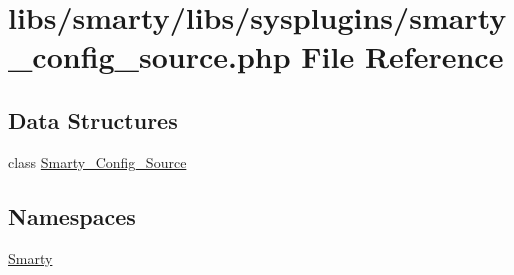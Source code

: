 \hypertarget{smarty__config__source_8php}{}\section{libs/smarty/libs/sysplugins/smarty\+\_\+config\+\_\+source.php File Reference}
\label{smarty__config__source_8php}
\subsection*{Data Structures}
\begin{DoxyCompactItemize}
\item 
class \hyperlink{class_smarty___config___source}{Smarty\+\_\+\+Config\+\_\+\+Source}
\end{DoxyCompactItemize}
\subsection*{Namespaces}
\begin{DoxyCompactItemize}
\item 
 \hyperlink{namespace_smarty}{Smarty}
\end{DoxyCompactItemize}

